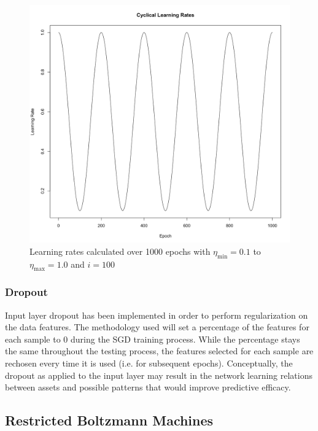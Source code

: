 \documentclass[a4paper,11pt,oneside]{article}
\theoremstyle{plain}
\theoremstyle{definition}
\begin{document}
\begin{figure}[H]
	\centering
	\includegraphics[scale=0.2]{images/implementation/CyclicalLearningRates.png}
	\caption[Cyclical Learning Rate Diagram]{Learning rates calculated over 1000 epochs with $\eta_{\min} = 0.1$ to $\eta_{\max} = 1.0$ and $i=100$}
	\label{figure-SGDRLearningRates}
\end{figure}

\subsubsection{Dropout}

Input layer dropout has been implemented in order to perform regularization on the data features. The methodology used will set a percentage of the features for each sample to 0 during the SGD training process. While the percentage stays the same throughout the testing process, the features selected for each sample are rechosen every time it is used (i.e. for subsequent epochs). Conceptually, the dropout as applied to the input layer may result in the network learning relations between assets and possible patterns that would improve predictive efficacy.

\subsection{Restricted Boltzmann Machines}\label{imp_rbm}
\end{document}
